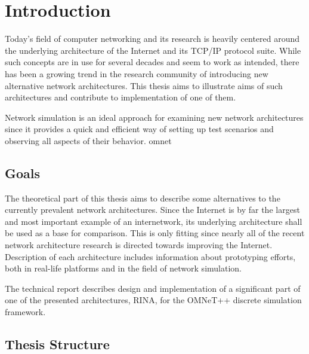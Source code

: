 

\chapter{Introduction}\label{intro}

    Today's field of computer networking and its research is heavily centered around the underlying architecture of the Internet and its TCP/IP protocol suite. While such concepts are in use for several decades and seem to work as intended, there has been a growing trend in the research community of introducing new alternative network architectures. This thesis aims to illustrate aims of such architectures and contribute to implementation of one of them.

    Network simulation is an ideal approach for examining new network architectures since it provides a quick and efficient way of setting up test scenarios and observing all aspects of their behavior. omnet

    \section{Goals}

        The theoretical part of this thesis aims to describe some alternatives to the currently prevalent network architectures. Since the Internet is by far the largest and most important example of an internetwork, its underlying architecture shall be used as a base for comparison. This is only fitting since nearly all of the recent network architecture research is directed towards improving the Internet. Description of each architecture includes information about prototyping efforts, both in real-life platforms and in the field of network simulation.

        The technical report describes design and implementation of a significant part of one of the presented architectures, RINA, for the OMNeT++ discrete simulation framework.

    \section{Thesis Structure}

